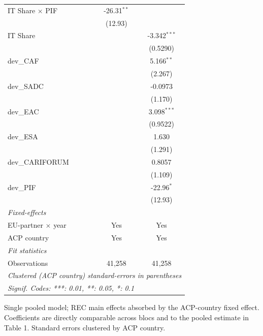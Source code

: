 \begin{tabular}{lcc}
   IT Share $\times$ PIF             & -26.31$^{**}$      &   \\   
                                     & (12.93)            &   \\   
   IT Share                          &                    & -3.342$^{***}$\\   
                                     &                    & (0.5290)\\   
   dev\_CAF                          &                    & 5.166$^{**}$\\   
                                     &                    & (2.267)\\   
   dev\_SADC                         &                    & -0.0973\\   
                                     &                    & (1.170)\\   
   dev\_EAC                          &                    & 3.098$^{***}$\\   
                                     &                    & (0.9522)\\   
   dev\_ESA                          &                    & 1.630\\   
                                     &                    & (1.291)\\   
   dev\_CARIFORUM                    &                    & 0.8057\\   
                                     &                    & (1.109)\\   
   dev\_PIF                          &                    & -22.96$^{*}$\\   
                                     &                    & (12.93)\\   
   \midrule
   \emph{Fixed-effects}\\
   EU-partner $\times$ year          & Yes                & Yes\\  
   ACP country                       & Yes                & Yes\\  
   \midrule
   \emph{Fit statistics}\\
   Observations                      & 41,258             & 41,258\\  
   \midrule \midrule
   \multicolumn{3}{l}{\emph{Clustered (ACP country) standard-errors in parentheses}}\\
   \multicolumn{3}{l}{\emph{Signif. Codes: ***: 0.01, **: 0.05, *: 0.1}}\\
\end{tabular}
 
\par \raggedright 
Single pooled model; REC main effects absorbed by the ACP-country fixed effect. Coefficients are directly comparable across blocs and to the pooled estimate in Table 1. Standard errors clustered by ACP country.
\par\endgroup



